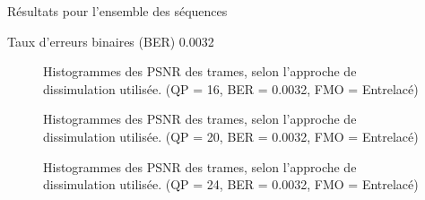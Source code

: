 \begin{section}{Résultats pour l'ensemble des séquences}
\begin{subsection}{Taux d'erreurs binaires (BER) 0.0032}
\begin{figure} 
\caption[]{Histogrammes des PSNR des trames, selon l'approche de dissimulation
utilisée. (QP = 16, BER = 0.0032, FMO = Entrelacé)}
\label{fig-HistAllDInterlaced16x32}
\end{figure}


\begin{figure} 
\caption[]{Histogrammes des PSNR des trames, selon l'approche de dissimulation
utilisée. (QP = 20, BER = 0.0032, FMO = Entrelacé)}
\label{fig-HistAllDInterlaced20x32}
\end{figure}


\begin{figure} 
\caption[]{Histogrammes des PSNR des trames, selon l'approche de dissimulation
utilisée. (QP = 24, BER = 0.0032, FMO = Entrelacé)}
\label{fig-HistAllDInterlaced24x32}
\end{figure}



\end{subsection}
\end{section}
